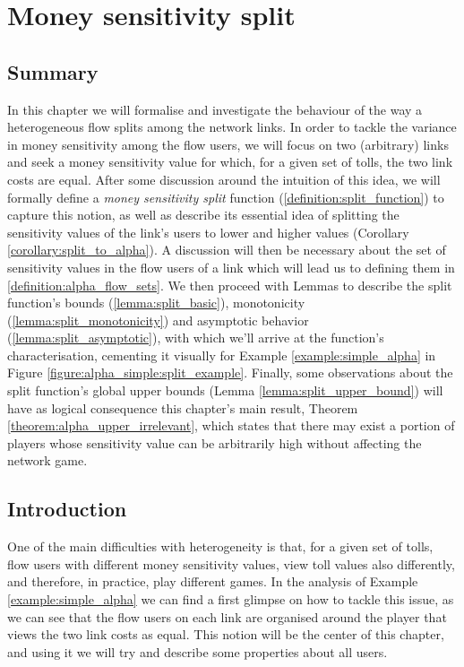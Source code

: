 \documentclass[10pt,a4paper]{book}
\theoremstyle{definition}
\theoremstyle{comment}
\begin{document}
\chapter{Money sensitivity split}
\label{chapter:split}

\section*{Summary}

In this chapter we will formalise and investigate the behaviour of the way a heterogeneous flow splits among the network links.
In order to tackle the variance in money sensitivity among the flow users, we will focus on two (arbitrary) links and seek a money sensitivity value for which, for a given set of tolls, the two link costs are equal.
After some discussion around the intuition of this idea, we will formally define a \textit{money sensitivity split} function (\ref{definition:split_function}) to capture this notion, as well as describe its essential idea of splitting the sensitivity values of the link's users to lower and higher values (Corollary \ref{corollary:split_to_alpha}).
A discussion will then be necessary about the set of sensitivity values in the flow users of a link which will lead us to defining them in \ref{definition:alpha_flow_sets}.
We then proceed with Lemmas to describe the split function's bounds (\ref{lemma:split_basic}), monotonicity (\ref{lemma:split_monotonicity}) and asymptotic behavior (\ref{lemma:split_asymptotic}), with which we'll arrive at the function's characterisation, cementing it visually for Example \ref{example:simple_alpha} in Figure \ref{figure:alpha_simple:split_example}.
Finally, some observations about the split function's global upper bounds (Lemma \ref{lemma:split_upper_bound}) will have as logical consequence this chapter's main result, Theorem \ref{theorem:alpha_upper_irrelevant}, which states that there may exist a portion of players whose sensitivity value can be arbitrarily high without affecting the network game.


\section{Introduction}

One of the main difficulties with heterogeneity is that, for a given set of tolls, flow users with different money sensitivity values, view toll values also differently, and therefore, in practice, play different games.
In the analysis of Example \ref{example:simple_alpha} we can find a first glimpse on how to tackle this issue, as we can see that the flow users on each link are organised around the player that views the two link costs as equal.
This notion will be the center of this chapter, and using it we will try and describe some properties about all users.
\end{document}
